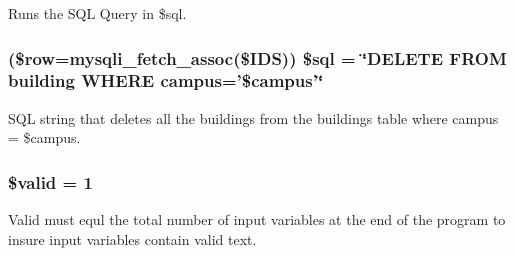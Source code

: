 \-Runs the \-S\-Q\-L \-Query in \$sql. \hypertarget{rmCampus_8php_a44dd5051c0321c5bf69d18bbc8cc43c3}{
\subsubsection[{\$sql}]{ (\$row=mysqli\-\_\-fetch\-\_\-assoc(\$\-I\-D\-S)) \$sql = \char`\"{}\-D\-E\-L\-E\-T\-E \-F\-R\-O\-M building \-W\-H\-E\-R\-E campus='\$campus'\char`\"{}}}\label{rmCampus_8php_a44dd5051c0321c5bf69d18bbc8cc43c3}
\-S\-Q\-L string that deletes all the buildings from the buildings table where campus = \$campus. \hypertarget{rmCampus_8php_a0587674d27d00ef497e08e53ccf45bbb}{
\subsubsection[{\$valid}]{\setlength{\rightskip}{0pt plus 5cm}\$valid = 1}}\label{rmCampus_8php_a0587674d27d00ef497e08e53ccf45bbb}
\-Valid must equl the total number of input variables at the end of the program to insure input variables contain valid text. 